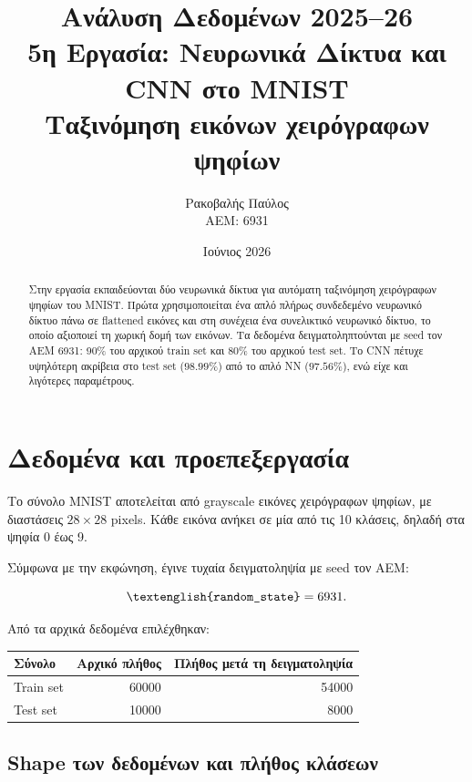 \documentclass[12pt,a4paper]{article}
\title{
    \textbf{Ανάλυση Δεδομένων 2025--26}\\[0.25cm]
    \Large 5η Εργασία: Νευρωνικά Δίκτυα και CNN στο MNIST\\[0.15cm]
    \large Ταξινόμηση εικόνων χειρόγραφων ψηφίων
}
\author{
    Ρακοβαλής Παύλος\\
    ΑΕΜ: 6931
}
\date{Ιούνιος 2026}
\newcommand{\code}[1]{\texttt{\textenglish{#1}}}
\begin{document}
\sloppy

\maketitle
\thispagestyle{fancy}

\begin{abstract}
Στην εργασία εκπαιδεύονται δύο νευρωνικά δίκτυα για αυτόματη ταξινόμηση
χειρόγραφων ψηφίων του MNIST. Πρώτα χρησιμοποιείται ένα απλό πλήρως συνδεδεμένο
νευρωνικό δίκτυο πάνω σε flattened εικόνες και στη συνέχεια ένα συνελικτικό
νευρωνικό δίκτυο, το οποίο αξιοποιεί τη χωρική δομή των εικόνων. Τα δεδομένα
δειγματοληπτούνται με seed τον ΑΕΜ 6931: 90\% του αρχικού train set και 80\%
του αρχικού test set. Το CNN πέτυχε υψηλότερη ακρίβεια στο test set
(\(98.99\%\)) από το απλό NN (\(97.56\%\)), ενώ είχε και λιγότερες παραμέτρους.
\end{abstract}

\tableofcontents
\newpage

\section{Δεδομένα και προεπεξεργασία}

Το σύνολο MNIST αποτελείται από grayscale εικόνες χειρόγραφων ψηφίων, με
διαστάσεις \(28 \times 28\) pixels. Κάθε εικόνα ανήκει σε μία από τις 10
κλάσεις, δηλαδή στα ψηφία 0 έως 9.

Σύμφωνα με την εκφώνηση, έγινε τυχαία δειγματοληψία με seed τον ΑΕΜ:

\[
    \text{\code{random\_state}} = 6931.
\]

Από τα αρχικά δεδομένα επιλέχθηκαν:

\begin{center}
\begin{tabular}{lrr}
\toprule
\textbf{Σύνολο} & \textbf{Αρχικό πλήθος} & \textbf{Πλήθος μετά τη δειγματοληψία} \\
\midrule
Train set & 60000 & 54000 \\
Test set  & 10000 & 8000 \\
\bottomrule
\end{tabular}
\end{center}

\subsection{Shape των δεδομένων και πλήθος κλάσεων}
\end{document}
